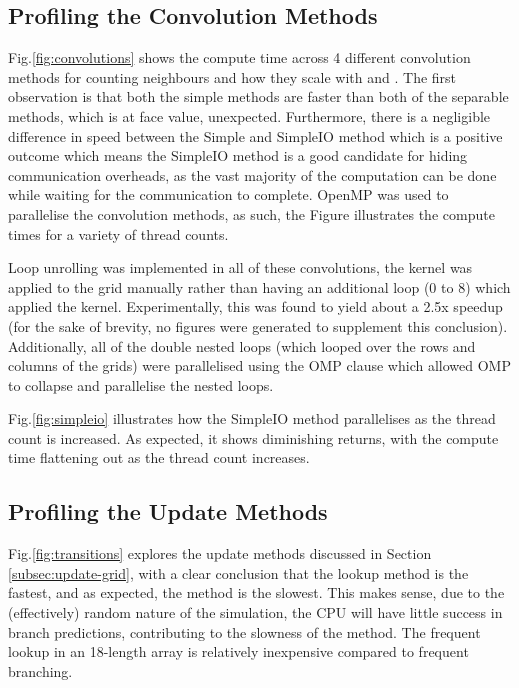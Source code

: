 \subsection{Profiling the Convolution Methods}\label{subsec:prof-conv}
Fig.\eqref{fig:convolutions} shows the compute time across 4 different convolution methods for counting neighbours
and how they scale with  and .
The first observation is that both the simple methods are faster than both of the separable methods, which is
at face value, unexpected.
Furthermore, there is a negligible difference in speed between the Simple and SimpleIO method which is a positive
outcome which means the SimpleIO method is a good candidate for hiding communication overheads, as the vast majority
of the computation can be done while waiting for the communication to complete.
OpenMP was used to parallelise the convolution methods, as such, the Figure illustrates the compute times for a variety
of thread counts.

Loop unrolling was implemented in all of these convolutions, the kernel was applied
to the grid manually rather than having an additional loop (0 to 8) which applied the kernel.
Experimentally, this was found to yield about a 2.5x speedup (for the sake of brevity, no figures were generated to
supplement this conclusion).
Additionally, all of the double nested loops (which looped over the rows and columns of the grids) were parallelised
using the OMP  clause which allowed OMP to collapse and parallelise the
nested loops.

Fig.\eqref{fig:simpleio} illustrates how the SimpleIO method parallelises as the thread count is increased.
As expected, it shows diminishing returns, with the compute time flattening out as the thread count increases.

\subsection{Profiling the Update Methods}\label{subsec:prof-trans}
Fig.\eqref{fig:transitions} explores the update methods discussed in Section \eqref{subsec:update-grid}, with a
clear conclusion that the lookup method is the fastest, and as expected, the  method is the slowest.
This makes sense, due to the (effectively) random nature of the simulation, the CPU will have little success
in branch predictions, contributing to the slowness of the  method.
The frequent lookup in an 18-length array is relatively inexpensive compared to frequent branching.

